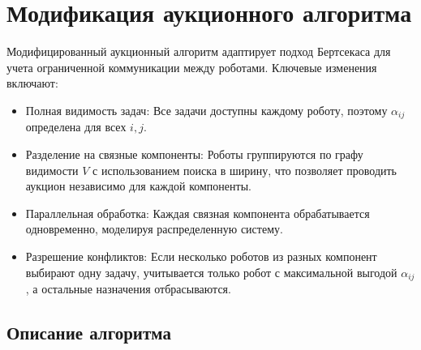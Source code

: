 \section{Модификация аукционного алгоритма}

Модифицированный аукционный алгоритм адаптирует подход Бертсекаса \cite{bertsekas1990} для учета ограниченной коммуникации между роботами. Ключевые изменения включают:
\begin{itemize}
    \item Полная видимость задач: Все задачи доступны каждому роботу, поэтому \( \alpha_{ij} \) определена для всех \( i, j \).
    \item Разделение на связные компоненты: Роботы группируются по графу видимости \( V \) с использованием поиска в ширину, что позволяет проводить аукцион независимо для каждой компоненты.
    \item Параллельная обработка: Каждая связная компонента обрабатывается одновременно, моделируя распределенную систему.
    \item Разрешение конфликтов: Если несколько роботов из разных компонент выбирают одну задачу, учитывается только робот с максимальной выгодой \( \alpha_{ij} \), а остальные назначения отбрасываются.
\end{itemize}

\subsection{Описание алгоритма}

